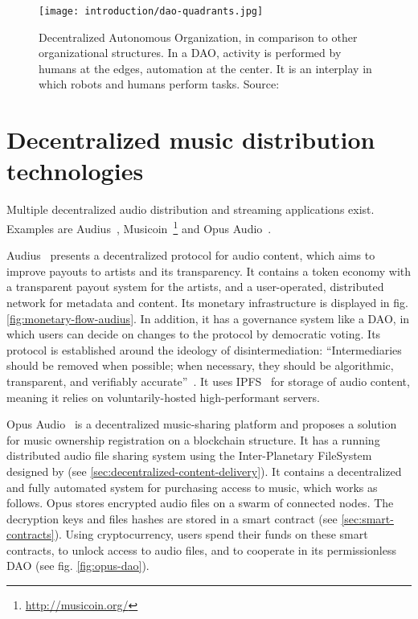 
\begin{figure}
    \centering
    \texttt{[image: introduction/dao-quadrants.jpg]}
    \caption{Decentralized Autonomous Organization, in comparison to other organizational structures. In a DAO, activity is performed by humans at the edges, automation at the center. It is an interplay in which robots and humans perform tasks. Source: \cite{buterin2014dao}}
    \label{fig:dao-quadrants}
\end{figure}

\section{Decentralized music distribution technologies}
Multiple decentralized audio distribution and streaming applications exist. Examples are Audius~\citep{audius2018}, Musicoin~\footnote{\url{http://musicoin.org/}} and Opus Audio~\citep{jia2016opus}.

Audius~\citep{audius2018} presents a decentralized protocol for audio content, which aims to improve payouts to artists and its transparency. It contains a token economy with a transparent payout system for the artists, and a user-operated, distributed network for metadata and content. Its monetary infrastructure is displayed in fig. \ref{fig:monetary-flow-audius}. In addition, it has a governance system like a DAO, in which users can decide on changes to the protocol by democratic voting. Its protocol is established around the ideology of disintermediation: ``Intermediaries  should be removed  when possible; when necessary, they should be algorithmic, transparent, and verifiably accurate''~\citep{audius2018}. It uses IPFS~\citep{benet2014ipfs} for storage of audio content, meaning it relies on voluntarily-hosted high-performant servers.

Opus Audio~\citep{jia2016opus} is a decentralized music-sharing platform and proposes a solution for music ownership registration on a blockchain structure. It has a running distributed audio file sharing system using the Inter-Planetary FileSystem designed by \cite{benet2014ipfs} (see \ref{sec:decentralized-content-delivery}). It contains a decentralized and fully automated system for purchasing access to music, which works as follows. Opus stores encrypted audio files on a swarm of connected nodes. The decryption keys and files hashes are stored in a smart contract (see \ref{sec:smart-contracts}). Using cryptocurrency, users spend their funds on these smart contracts, to unlock access to audio files, and to cooperate in its permissionless DAO (see fig. \ref{fig:opus-dao}).

